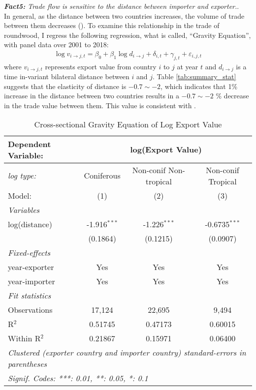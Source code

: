 \documentclass[a4paper,12pt]{article}
\begin{document}
   \textit{\textbf{Fact5:} Trade flow is sensitive to the distance between importer and exporter.}.\\
   In general, as the distance between two countries increases, the volume of trade between them decreases (\cite{allen201813}). To examine this relationship in the trade of roundwood, I regress the following regression, what is called, ``Gravity Equation'', with panel data over 2001 to 2018:
   \begin{align}
    \log v_{i \to j, t} = \beta_0 + \beta_1 \log d_{i \to j} + \delta_{i, t} + \gamma_{j, t} + \varepsilon_{i,j,t}
   \end{align}
   where $v_{i \to j, t}$ represents export value from country $i$ to $j$ at year $t$ and $d_{i \to j}$ is a time in-variant bilateral distance between $i$ and $j$. Table \ref{tab:summary_stat} suggests that the elasticity of distance is $-0.7 \sim -2$, which indicates that 1\% increase in the distance between two countries results in a $-0.7 \sim -2$ \% decrease in the trade value between them. This value is consistent with \cite{allen201813}.
   
   \begin{table}[htbp]
    \caption{Cross-sectional Gravity Equation of Log Export Value}
    \centering
    \begin{tabular}{lccc}
       \tabularnewline \midrule \midrule
       Dependent Variable: & \multicolumn{3}{c}{log(Export Value)}\\
       \midrule
       \textit{log type: } & Coniferous & Non-conif Non-tropical & Non-conif Tropical\\
       Model:                             & (1)            & (2)            & (3)\\  
       \midrule
       \emph{Variables}\\
       log(distance)                         & -1.916$^{***}$ & -1.226$^{***}$ & -0.6735$^{***}$\\   
       & (0.1864)       & (0.1215)       & (0.0907)\\   
        \midrule
        \emph{Fixed-effects}\\
        year-exporter  & Yes            & Yes            & Yes\\  
        year-importer   & Yes            & Yes            & Yes\\  
        \midrule
        \emph{Fit statistics}\\
        Observations                       & 17,124         & 22,695         & 9,494\\  
        R$^2$                              & 0.51745        & 0.47173        & 0.60015\\  
        Within R$^2$                       & 0.21867        & 0.15971        & 0.06400\\  
        \midrule \midrule
        \multicolumn{4}{l}{\emph{Clustered (exporter country and importer country) standard-errors in parentheses}}\\
        \multicolumn{4}{l}{\emph{Signif. Codes: ***: 0.01, **: 0.05, *: 0.1}}\\
    \end{tabular}
 \end{table}
\end{document}
